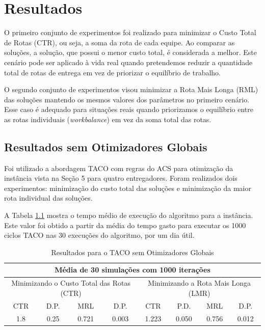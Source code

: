\chapter{Resultados}


O primeiro conjunto de experimentos foi realizado para minimizar o Custo Total de Rotas (CTR), ou seja, a soma da rota de cada equipe. Ao comparar as soluções, a solução, que possui o menor custo total, é considerada a melhor. Este cenário pode ser aplicado à vida real quando pretendemos reduzir a quantidade total de rotas de entrega em vez de priorizar o equilíbrio de trabalho.

O segundo conjunto de experimentos visou minimizar a Rota Mais Longa (RML) das soluções mantendo os mesmos valores dos parâmetros no primeiro cenário. Esse caso é adequado para situações reais quando priorizamos o equilíbrio entre as rotas individuais (\textit{workbalance}) em vez da soma total das rotas.

\section{Resultados sem Otimizadores Globais}
\label{sec-resultados-taco}

Foi utilizado a abordagem TACO com regras do ACS para otimização da instância vista na Seção 5 para quatro entregadores. Foram realizados dois experimentos: minimização do custo total das soluções e minimização da maior rota individual das soluções.

A Tabela \ref{tab:resultado-taco} mostra o tempo médio de execução do algoritmo para a instância. Este valor foi obtido a partir da média do tempo gasto para executar os 1000 ciclos TACO nas 30 execuções do algoritmo, por um dia útil.

\begin{table}[htb]
    \centering
    \caption{Resultados para o TACO sem Otimizadores Globais} \label{tab:resultado-taco}
\begin{tabular}{|c|c|c|c|c|c|c|c|}
\hline
\multicolumn{8}{|c|}{Média de 30 simulações com 1000 iterações}                                                            \\ \hline
\multicolumn{4}{|c|}{Minimizando o Custo Total das Rotas (CTR)} & \multicolumn{4}{c|}{Minimizando a Rota Mais Longa (LMR)} \\ \hline
CTR           & D.P.          & MRL            & D.P.           & CTR           & P.D.         & MRL         & D.P.        \\ \hline
1.8           & 0.25          & 0.721          & 0.003          & 1.223         & 0.050        & 0.756       & 0.012       \\ \hline
\end{tabular}
\end{table}

